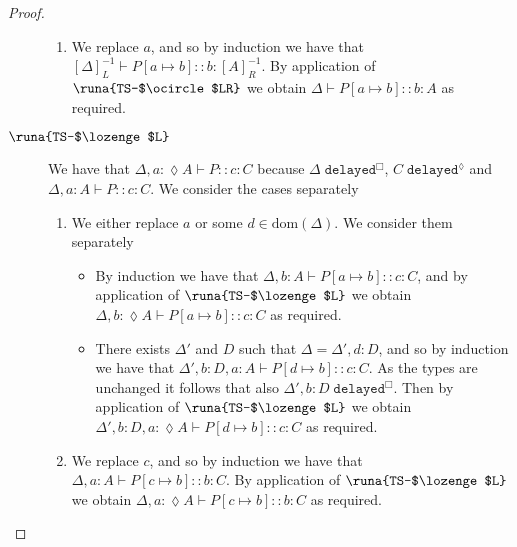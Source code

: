 \begin{lemma}
\begin{proof}
\begin{description}
\begin{enumerate}
    \item We replace $a$, and so by induction we have that $[\Delta]^{-1}_L\vdash P[a\mapsto b] :: b\!:\![A]^{-1}_R$. By application of $\runa{TS-$\ocircle$LR}$ we obtain $\Delta\vdash P[a\mapsto b] :: b\!:\!A$ as required.
\end{enumerate}


\item[$\runa{TS-$\lozenge$L}$] We have that $\Delta,a:\lozenge A\vdash P :: c\!:\!C$ because $\Delta\;\texttt{delayed}^\Box$, $C\;\texttt{delayed}^\lozenge$ and $\Delta,a:A\vdash P :: c\!:\!C$. We consider the cases separately
\begin{enumerate}
    \item We either replace $a$ or some $d\in\text{dom}(\Delta)$. We consider them separately
    \begin{itemize}
        \item By induction we have that $\Delta,b:A\vdash P[a\mapsto b] :: c\!:\!C$, and by application of $\runa{TS-$\lozenge$L}$ we obtain $\Delta,b:\lozenge A\vdash P[a\mapsto b] :: c\!:\!C$ as required.
        
        \item There exists $\Delta'$ and $D$ such that $\Delta=\Delta',d:D$, and so by induction we have that $\Delta',b:D,a:A\vdash P[d\mapsto b] :: c\!:\!C$. As the types are unchanged it follows that also $\Delta',b:D\;\texttt{delayed}^\Box$. Then by application of $\runa{TS-$\lozenge$L}$ we obtain $\Delta',b:D,a:\lozenge A\vdash P[d\mapsto b] :: c\!:\!C$ as required.
    \end{itemize}
    
    \item We replace $c$, and so by induction we have that $\Delta, a:A\vdash P[c\mapsto b] :: b\!:\!C$. By application of $\runa{TS-$\lozenge$L}$ we obtain $\Delta,a:\lozenge A\vdash P[c\mapsto b] :: b\!:\!C$ as required.
\end{enumerate}


\end{description}
\end{proof}
\end{lemma}
